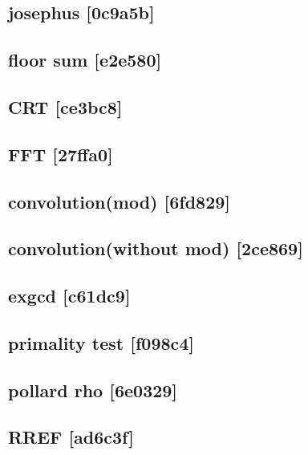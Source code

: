 \subsection{josephus {\footnotesize [0c9a5b]} }

\subsection{floor sum {\footnotesize [e2e580]} }

\subsection{CRT {\footnotesize [ce3bc8]} }

\subsection{FFT {\footnotesize [27ffa0]} }

\subsection{convolution(mod) {\footnotesize [6fd829]} }

\subsection{convolution(without mod) {\footnotesize [2ce869]} }

\subsection{exgcd {\footnotesize [c61dc9]} }

\subsection{primality test {\footnotesize [f098c4]} }

\subsection{pollard rho {\footnotesize [6e0329]} }

\subsection{RREF {\footnotesize [ad6c3f]} }

